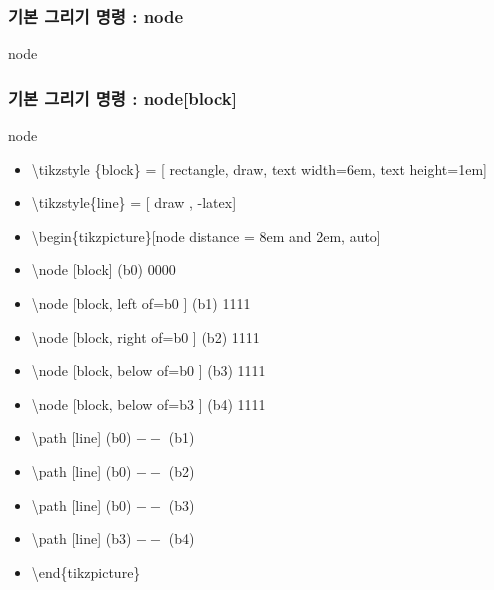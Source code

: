 \documentclass[ aspectratio=169,  10pt,blue,xcolor=pdftex,dvipsnames,table,handout,notes]{beamer}
\begin{document}
		\begin{frame}[t]
		\frametitle{기본 그리기 명령 : node}

			\begin{block}{node}
			\end{block}


		\note[item]{}
		\end{frame}




		\begin{frame}[t]
		\frametitle{기본 그리기 명령 : node[block]}

			\begin{block}{node}
			\begin{itemize}
			\item[] 	\textbackslash tikzstyle \{block\} = [ rectangle, draw, text width=6em, text height=1em]
			\item[] 	\textbackslash tikzstyle\{line\} = [ draw , -latex]
			\item[] 	\textbackslash begin\{tikzpicture\}[node distance = 8em and 2em, auto]

			\item[] 	\textbackslash node [block] (b0) 				{ 0000 }
			\item[] 	\textbackslash node [block, left of=b0 ] (b1) 	{ 1111 }
			\item[] 	\textbackslash node [block, right of=b0 ] (b2) 	{ 1111 }
			\item[] 	\textbackslash node [block, below of=b0 ] (b3) 	{ 1111 }
			\item[] 	\textbackslash node [block, below of=b3 ] (b4) 	{ 1111 }
			\item[] 	\textbackslash path [line] (b0) $--$ (b1)
			\item[] 	\textbackslash path [line] (b0) $--$ (b2)
			\item[] 	\textbackslash path [line] (b0) $--$ (b3)
			\item[] 	\textbackslash path [line] (b3) $--$ (b4)
			\item[] 	\textbackslash end\{tikzpicture\}

			\end{itemize}
			\end{block}

		\end{frame}
\end{document}
